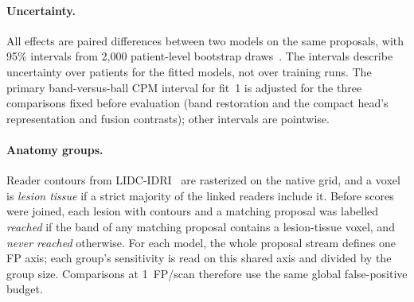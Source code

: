 \paragraph{Uncertainty.} All effects are paired differences between two models on the same proposals, with 95\% intervals from 2,000 patient-level bootstrap draws~\cite{efron1993bootstrap}. The intervals describe uncertainty over patients for the fitted models, not over training runs. The primary band-versus-ball CPM interval for fit~1 is adjusted for the three comparisons fixed before evaluation (band restoration and the compact head's representation and fusion contrasts); other intervals are pointwise.

\paragraph{Anatomy groups.} Reader contours from LIDC-IDRI~\cite{armato2011lidc,fedorov2020lidc} are rasterized on the native grid, and a voxel is \emph{lesion tissue} if a strict majority of the linked readers include it. Before scores were joined, each lesion with contours and a matching proposal was labelled \emph{reached} if the band of any matching proposal contains a lesion-tissue voxel, and \emph{never reached} otherwise. For each model, the whole proposal stream defines one FP axis; each group's sensitivity is read on this shared axis and divided by the group size. Comparisons at 1~FP/scan therefore use the same global false-positive budget.
